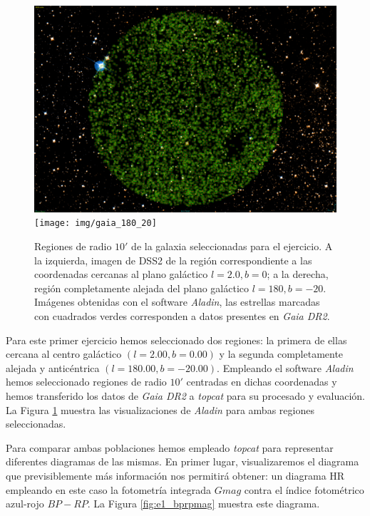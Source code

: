 \documentclass[a4paper,fleqn,usenatbib]{mnras}
\begin{document}
\begin{figure}
  \includegraphics[width=0.49\linewidth]{img/gaia_2_0}
  \texttt{[image: img/gaia\_180\_20]}
  \caption{Regiones de radio $10'$ de la galaxia seleccionadas para el ejercicio. A la izquierda, imagen de \ac{DSS2} de la región correspondiente a las coordenadas cercanas al plano galáctico $l=2.0,b=0$; a la derecha, región completamente alejada del plano galáctico $l=180,b=-20$. Imágenes obtenidas con el software \emph{Aladin}, las estrellas marcadas con cuadrados verdes corresponden a datos presentes en \emph{Gaia DR2}.}
  \label{fig:e1_regiones}
\end{figure}

Para este primer ejercicio hemos seleccionado dos regiones: la primera de ellas cercana al centro galáctico $(l=2.00, b=0.00)$ y la segunda completamente alejada y anticéntrica $(l=180.00, b=-20.00)$. Empleando el software \emph{Aladin} hemos seleccionado regiones de radio $10'$ centradas en dichas coordenadas y hemos transferido los datos de \emph{Gaia DR2} a \emph{topcat} para su procesado y evaluación. La Figura \ref{fig:e1_regiones} muestra las visualizaciones de \emph{Aladin} para ambas regiones seleccionadas.

Para comparar ambas poblaciones hemos empleado \emph{topcat} para representar diferentes diagramas de las mismas. En primer lugar, visualizaremos el diagrama que previsiblemente más información nos permitirá obtener: un diagrama HR empleando en este caso la fotometría integrada $Gmag$ contra el índice fotométrico azul-rojo $BP-RP$. La Figura \ref{fig:e1_bprpmag} muestra este diagrama.
\end{document}
